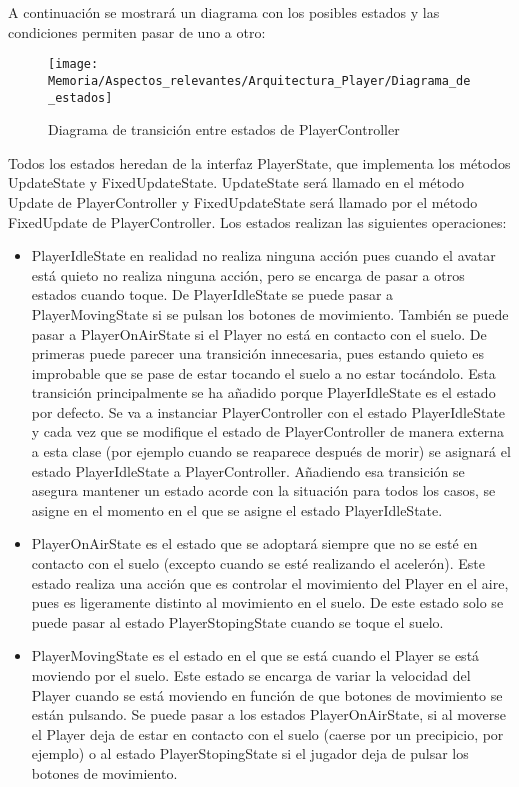 A continuación se mostrará un diagrama con los posibles estados y las condiciones permiten pasar de uno a otro:

\begin{figure}[h]
\centering
\texttt{[image: Memoria/Aspectos\_relevantes/Arquitectura\_Player/Diagrama\_de\_estados]}
\caption{Diagrama de transición entre estados de PlayerController}
\end{figure}

Todos los estados heredan de la interfaz PlayerState, que implementa los métodos UpdateState y FixedUpdateState. UpdateState será llamado en el método Update de PlayerController y FixedUpdateState será llamado por el método FixedUpdate de PlayerController. Los estados realizan las siguientes operaciones:
\begin{itemize}
\item
PlayerIdleState en realidad no realiza ninguna acción pues cuando el avatar está quieto no realiza ninguna acción, pero se encarga de pasar a otros estados cuando toque. De PlayerIdleState se puede pasar a PlayerMovingState si se pulsan los botones de movimiento. También se puede pasar a PlayerOnAirState si el Player no está en contacto con el suelo. De primeras puede parecer una transición innecesaria, pues estando quieto es improbable que se pase de estar tocando el suelo a no estar tocándolo. Esta transición principalmente se ha añadido porque PlayerIdleState es el estado por defecto. Se va a instanciar PlayerController con el estado PlayerIdleState y cada vez que se modifique el estado de PlayerController de manera externa a esta clase (por ejemplo cuando se reaparece después de morir) se asignará el estado PlayerIdleState a PlayerController. Añadiendo esa transición se asegura mantener un estado acorde con la situación para todos los casos, se asigne en el momento en el que se asigne el estado PlayerIdleState.
\item
PlayerOnAirState es el estado que se adoptará siempre que no se esté en contacto con el suelo (excepto cuando se esté realizando el acelerón). Este estado realiza una acción que es controlar el movimiento del Player en el aire, pues es ligeramente distinto al movimiento en el suelo. De este estado solo se puede pasar al estado PlayerStopingState cuando se toque el suelo.
\item
PlayerMovingState es el estado en el que se está cuando el Player se está moviendo por el suelo. Este estado se encarga de variar la velocidad del Player cuando se está moviendo en función de que botones de movimiento se están pulsando. Se puede pasar a los estados PlayerOnAirState, si al moverse el Player deja de estar en contacto con el suelo (caerse por un precipicio, por ejemplo) o al estado PlayerStopingState si el jugador deja de pulsar los botones de movimiento.

\end{itemize}

